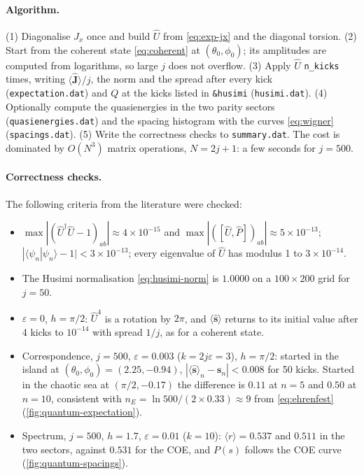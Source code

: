\documentclass[11pt,a4paper]{article}
\newcommand{\vJ}{\bm{J}}
\begin{document}
\paragraph{Algorithm.} (1) Diagonalise $\hat J_x$ once and build $\hat U$ from \eqref{eq:exp-jx} and the diagonal torsion.
(2) Start from the coherent state \eqref{eq:coherent} at $(\theta_0,\phi_0)$; its amplitudes are computed from
logarithms, so large $j$ does not overflow. (3) Apply $\hat U$ \texttt{n\_kicks} times, writing
$\langle\hat{\vJ}\rangle/j$, the norm and the spread after every kick (\texttt{expectation.dat}) and $Q$ at the kicks
listed in \texttt{\&husimi} (\texttt{husimi.dat}). (4) Optionally compute the quasienergies in the two parity sectors
(\texttt{quasienergies.dat}) and the spacing histogram with the curves \eqref{eq:wigner} (\texttt{spacings.dat}).
(5) Write the correctness checks to \texttt{summary.dat}. The cost is dominated by $O(N^3)$ matrix operations,
$N = 2j+1$: a few seconds for $j = 500$.

\paragraph{Correctness checks.} The following criteria from the literature \cite{Haake,HKS1987,Atas2013} were checked:
\begin{itemize}
  \item $\max|(\hat U^\dagger\hat U - 1)_{ab}| \approx 4\times10^{-15}$ and $\max|([\hat U,\hat P])_{ab}| \approx
  5\times10^{-13}$; $|\langle\psi_n|\psi_n\rangle - 1| < 3\times10^{-13}$; every eigenvalue of $\hat U$ has modulus 1
  to $3\times10^{-14}$.
  \item The Husimi normalisation \eqref{eq:husimi-norm} is $1.0000$ on a $100\times200$ grid for $j = 50$.
  \item $\varepsilon = 0$, $h = \pi/2$: $\hat U^4$ is a rotation by $2\pi$, and $\langle\hat{\bm s}\rangle$ returns to its initial
  value after 4 kicks to $10^{-14}$ with spread $1/j$, as for a coherent state.
  \item Correspondence, $j = 500$, $\varepsilon = 0.003$ ($k = 2j\varepsilon = 3$), $h=\pi/2$: started in the island at $(\theta_0,\phi_0) = (2.25, -0.94)$,
  $|\langle\hat{\bm s}\rangle_n - \bm s_n| < 0.008$ for 50 kicks. Started in the chaotic sea at $(\pi/2, -0.17)$ the
  difference is $0.11$ at $n = 5$ and $0.50$ at $n = 10$, consistent with $n_E = \ln 500/(2\times0.33) \approx 9$
  from \eqref{eq:ehrenfest} (\cref{fig:quantum-expectation}).
  \item Spectrum, $j = 500$, $h = 1.7$, $\varepsilon = 0.01$ ($k = 10$): $\langle r\rangle = 0.537$ and $0.511$ in the two sectors,
  against $0.531$ for the COE, and $P(s)$ follows the COE curve (\cref{fig:quantum-spacings}).
\end{itemize}
\end{document}
